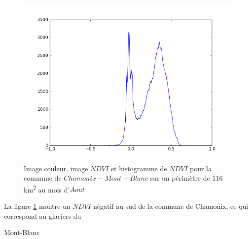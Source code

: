 \documentclass{book}
\begin{document}
\begin{figure}[H]
{}
\begin{center}
\includegraphics[scale=0.45]{../3_ndvi/images/Chamonix/08_ndvi_histo.png}
\end{center}
\caption{Image couleur, image $NDVI$ et histogramme de $NDVI$ pour la commune de $Chamonix-Mont-Blanc$ sur un périmètre de $116$km\textsuperscript{2} au mois d'$Aout$}
\label{chamonix_ndvi}
\end{figure}

La figure \ref{chamonix_ndvi} montre un $NDVI$ négatif au sud de la commune de Chamonix, ce qui correspond au glaciers du \begin{itshape}Mont-Blanc\end{itshape}\\

\clearpage 
\end{document}
